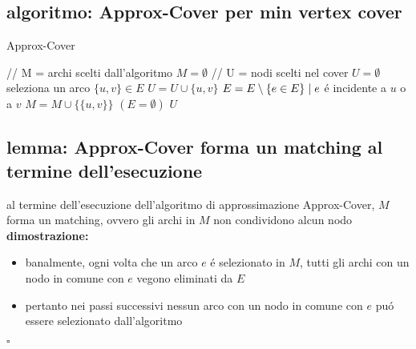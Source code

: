 
\subsection*{algoritmo: Approx-Cover per min vertex cover}
\begin{flushleft}
	\begin{algorithm}
		\caption{Approx-Cover}
		\begin{algorithmic}
			\STATE \color{gray} // M = archi scelti dall'algoritmo \color{black}
			\STATE $M=\emptyset$
			\STATE \color{gray} // U = nodi scelti nel cover \color{black}
			\STATE $U=\emptyset$
			\REPEAT
				\STATE seleziona un arco $\{u,v\}\in E$
				\STATE $U=U\cup\{u,v\}$
				\STATE $E=E\setminus\{e\in E\}\hspace{0.1cm}\vert\hspace{0.1cm}e$ \'e incidente a $u$ o a $v$
				\STATE $M=M\cup\{\{u,v\}\}$
			\UNTIL $(E=\emptyset)$
			\RETURN $U$
		\end{algorithmic}
	\end{algorithm}
\end{flushleft}


\subsection*{lemma: Approx-Cover forma un matching al termine dell'esecuzione}
\begin{flushleft}
	al termine dell'esecuzione dell'algoritmo di approssimazione Approx-Cover, $M$ forma un matching, ovvero gli archi in $M$ non condividono alcun nodo \newline \\
	\textbf{dimostrazione:}
	\begin{itemize}
		\item banalmente, ogni volta che un arco $e$ \'e selezionato in $M$, tutti gli archi con un nodo in comune con $e$ vegono eliminati da $E$
		\item pertanto nei passi successivi nessun arco con un nodo in comune con $e$ pu\'o essere selezionato dall'algoritmo
	\end{itemize}
	\hfill$\square$
\end{flushleft}

